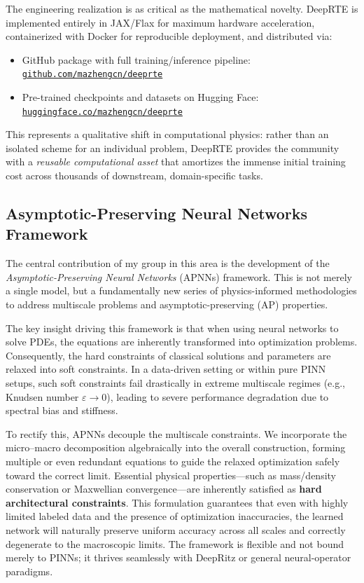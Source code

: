 The engineering realization is as critical as the mathematical novelty.  DeepRTE
is implemented entirely in JAX/Flax for maximum hardware acceleration,
containerized with Docker for reproducible deployment, and distributed via:
\begin{itemize}
  \item GitHub package with full training/inference pipeline:\\\texttt{\href{https://github.com/mazhengcn/deeprte}{github.com/mazhengcn/deeprte}}
  \item Pre-trained checkpoints and datasets on Hugging Face:\\\texttt{\href{https://huggingface.co/mazhengcn/deeprte}{huggingface.co/mazhengcn/deeprte}}
\end{itemize}
This represents a qualitative shift in computational physics: rather than an
isolated scheme for an individual problem, DeepRTE provides the community
with a \emph{reusable computational asset} that amortizes the immense initial
training cost across thousands of downstream, domain-specific tasks.

\subsection{Asymptotic-Preserving Neural Networks Framework}

The central contribution of my group in this area is the development of the \emph{Asymptotic-Preserving Neural Networks} (APNNs) framework. This is not merely a single model, but a fundamentally new series of physics-informed methodologies to address multiscale problems and asymptotic-preserving (AP) properties.

The key insight driving this framework is that when using neural networks to solve PDEs, the equations are inherently transformed into optimization problems. Consequently, the hard constraints of classical solutions and parameters are relaxed into soft constraints. In a data-driven setting or within pure PINN setups, such soft constraints fail drastically in extreme multiscale regimes (e.g., Knudsen number $\varepsilon \to 0$), leading to severe performance degradation due to spectral bias and stiffness.

To rectify this, APNNs decouple the multiscale constraints. We incorporate the micro--macro decomposition algebraically into the overall construction, forming multiple or even redundant equations to guide the relaxed optimization safely toward the correct limit. Essential physical properties---such as mass/density conservation or Maxwellian convergence---are inherently satisfied as \textbf{hard architectural constraints}. This formulation guarantees that even with highly limited labeled data and the presence of optimization inaccuracies, the learned network will naturally preserve uniform accuracy across all scales and correctly degenerate to the macroscopic limits. The framework is flexible and not bound merely to PINNs; it thrives seamlessly with DeepRitz or general neural-operator paradigms.

